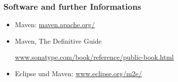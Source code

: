 \subsubsection{Software and further Informations}
\begin{itemize}
\item Maven: \href{http://maven.apache.org/}{maven.apache.org/}
\item Maven, The Definitive Guide

\href{http://www.sonatype.com/book/reference/public-book.html}
{www.sonatype.com/book/reference/public-book.html}

\item Eclipse und Maven:
  \href{http://www.eclipse.org/m2e/}{www.eclipse.org/m2e/}
%
%
%
%
%
%
%
%
%
%
%
%
%
%
%
\end{itemize}

